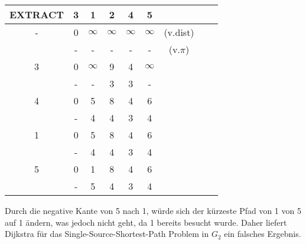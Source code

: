\documentclass[10pt,a4paper,oneside,ngerman,numbers=noenddot]{scrartcl}
\begin{document}
		\begin{tabular}{c|c|c|c|c|c|c|c|c}
			EXTRACT & 3 & 1 & 2 & 4 & 5 &\\
			\hline
			- & 0 & $\infty$ & $\infty$ & $\infty$ & $\infty$ & (v.dist) \\
			& - & - & - & - & - & (v.$\pi$) \\
			\hline
			3 & 0 & $\infty$ & 9 & 4 & $\infty$ & \\
			& - & - & 3 & 3 & - & \\
			\hline
			4 & 0 & 5 & 8 & 4 & 6 & \\
			& - & 4 & 4 & 3 & 4 & \\
			\hline
			1 & 0 & 5 & 8 & 4 & 6 & \\
			& - & 4 & 4 & 3 & 4 & \\
			\hline
			5 & 0 & 1 & 8 & 4 & 6 & \\
			& - & 5 & 4 & 3 & 4 & \\
		\end{tabular}
		
		Durch die negative Kante von 5 nach 1, würde sich der kürzeste Pfad von 1 von 5 auf 1 ändern, was jedoch nicht geht, da 1 bereits besucht wurde. Daher liefert Dijkstra für das Single-Source-Shortest-Path Problem in $G_{2}$ ein falsches Ergebnis.
\section{} %
\section{} %
	\subsection{} %
	\subsection{} %
	\subsection{} %
\section{} %
	\subsection{} %
	\subsection{} %
\end{document}
